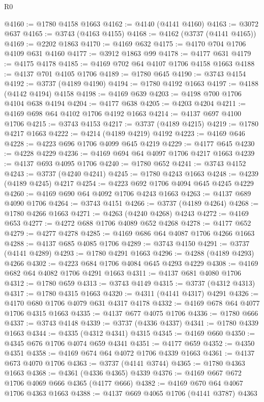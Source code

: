 \begin{lexlean}{R0}
\begin{coremodule}
@4160 := @1780 @4158 @1663
@4162 := @4140 (@4141 @4160)
@4163 := @3072 @637
@4165 := @3743 (@4163 @4155)
@4168 := @4162 (@3737 (@4141 @4165))
@4169 := @2202 @1863
@4170 := @4169 @632
@4175 := @4170 @704 @1706 @4109 @631 @4160
@4177 := @3912 @1863 @99
@4178 := @4177 @631
@4179 := @4175 @4178
@4185 := @4169 @702 @64 @4107 @1706 @4158 @1663
@4188 := @4137 @701 @4105 @1706
@4189 := @1780 @645
@4190 := @3743 @4154
@4192 := @3737 (@4189 @4190)
@4194 := @1780 @4192 @1663
@4197 := @4188 (@4142 @4194) @4158
@4198 := @4169 @639
@4203 := @4198 @700 @1706 @4104 @638 @4194
@4204 := @4177 @638
@4205 := @4203 @4204
@4211 := @4169 @698 @64 @4102 @1706 @4192 @1663
@4214 := @4137 @697 @4100 @1706
@4215 := @3743 @4153
@4217 := @3737 (@4189 @4215)
@4219 := @1780 @4217 @1663
@4222 := @4214 (@4189 @4219) @4192
@4223 := @4169 @646
@4228 := @4223 @696 @1706 @4099 @645 @4219
@4229 := @4177 @645
@4230 := @4228 @4229
@4236 := @4169 @694 @64 @4097 @1706 @4217 @1663
@4239 := @4137 @693 @4095 @1706
@4240 := @1780 @652
@4241 := @3743 @4152
@4243 := @3737 (@4240 @4241)
@4245 := @1780 @4243 @1663
@4248 := @4239 (@4189 @4245) @4217
@4254 := @4223 @692 @1706 @4094 @645 @4245 @4229
@4260 := @4169 @690 @64 @4092 @1706 @4243 @1663
@4263 := @4137 @689 @4090 @1706
@4264 := @3743 @4151
@4266 := @3737 (@4189 @4264)
@4268 := @1780 @4266 @1663
@4271 := @4263 (@4240 @4268) @4243
@4272 := @4169 @653
@4277 := @4272 @688 @1706 @4089 @652 @4268
@4278 := @4177 @652
@4279 := @4277 @4278
@4285 := @4169 @686 @64 @4087 @1706 @4266 @1663
@4288 := @4137 @685 @4085 @1706
@4289 := @3743 @4150
@4291 := @3737 (@4141 @4289)
@4293 := @1780 @4291 @1663
@4296 := @4288 (@4189 @4293) @4266
@4302 := @4223 @684 @1706 @4084 @645 @4293 @4229
@4308 := @4169 @682 @64 @4082 @1706 @4291 @1663
@4311 := @4137 @681 @4080 @1706
@4312 := @1780 @659
@4313 := @3743 @4149
@4315 := @3737 (@4312 @4313)
@4317 := @1780 @4315 @1663
@4320 := @4311 (@4141 @4317) @4291
@4326 := @4170 @680 @1706 @4079 @631 @4317 @4178
@4332 := @4169 @678 @64 @4077 @1706 @4315 @1663
@4335 := @4137 @677 @4075 @1706
@4336 := @1780 @666
@4337 := @3743 @4148
@4339 := @3737 (@4336 @4337)
@4341 := @1780 @4339 @1663
@4344 := @4335 (@4312 @4341) @4315
@4345 := @4169 @660
@4350 := @4345 @676 @1706 @4074 @659 @4341
@4351 := @4177 @659
@4352 := @4350 @4351
@4358 := @4169 @674 @64 @4072 @1706 @4339 @1663
@4361 := @4137 @673 @4070 @1706
@4363 := @3737 (@4141 @3744)
@4365 := @1780 @4363 @1663
@4368 := @4361 (@4336 @4365) @4339
@4376 := @4169 @667 @672 @1706 @4069 @666 @4365 (@4177 @666)
@4382 := @4169 @670 @64 @4067 @1706 @4363 @1663
@4388 := @4137 @669 @4065 @1706 (@4141 @3787) @4363

\end{coremodule}
\end{lexlean}
